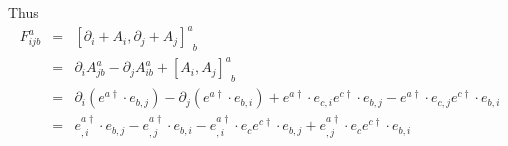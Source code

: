 \documentclass[12pt,a4paper]{article}
\begin{document}
\begin{enumerate}
Thus
\begin{eqnarray*}
	F^a_{ijb} &=& [\partial_i + A_i , \partial_j + A_j]^a_{\phantom ab} \\
	&=& \partial_i A_{jb}^a - \partial_j A^a_{ib} + [A_i,A_j]^a_{\phantom ab} \\
	&=& \partial_i(e^{a\dag}\cdot e_{b,j} ) - \partial_j( e^{a\dag}\cdot e_{b,i} ) + e^{a\dag} \cdot e_{c,i} e^{c\dag}\cdot e_{b,j} - e^{a\dag} \cdot e_{c,j}e^{c\dag}\cdot e_{b,i} \\
	&=& e^{a\dag}_{,i} \cdot e_{b,j} - e^{a\dag}_{,j} \cdot e_{b,i} - e^{a\dag}_{,i}\cdot e_{c} e^{c\dag}\cdot e_{b,j} + e^{a\dag}_{,j} \cdot e_{c} e^{c\dag} \cdot e_{b,i}
\end{eqnarray*}


















\end{enumerate}
\end{document}
